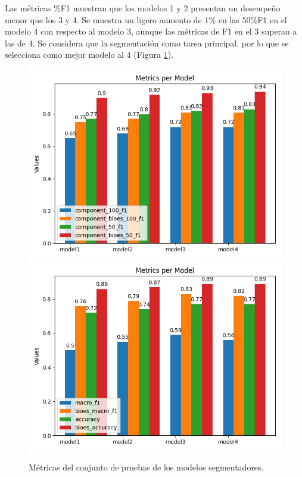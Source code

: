 Las métricas \%F1 muestran que los modelos 1 y 2 presentan un desempeño menor que los 3 y 4. 
Se muestra un ligero aumento de 1\% en las 50\%F1 en el modelo 4 con respecto 
al modelo 3, aunque las métricas de F1 en el 3 superan a las de 4. Se considera que la 
segmentación como tarea principal, por lo que se selecciona como mejor modelo al 4 (Figura \ref{fig:test_segmenter_model_metrics}).

\begin{figure}[h!]
	\begin{center}
		\includegraphics[scale=.4]{Graphics/persuasive_essays_all_linked_components.png}
		\includegraphics[scale=.4]{Graphics/persuasive_essays_all_linked_macro_micro_metrics.png}
	    \caption{Métricas del conjunto de pruebas de los modelos segmentadores.}\label{fig:test_segmenter_model_metrics}
	\end{center}
\end{figure}

